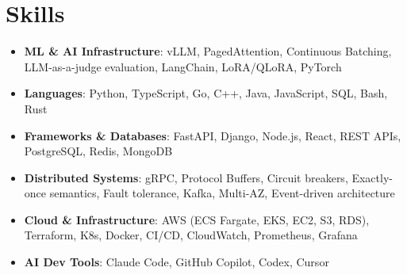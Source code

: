 \documentclass[letterpaper,11pt]{article}
\newcommand{\resumeSubHeadingListStart}{\begin{itemize}[leftmargin=0.15in, label={}]}
\newcommand{\resumeSubHeadingListEnd}{\end{itemize}}
\newcommand{\resumeSkillHeading}[2]{%
  \item\small{\textbf{#1}: #2 \vspace{-9pt}}%
}
\begin{document}
\section{Skills}
  \resumeSubHeadingListStart
    \resumeSkillHeading{ML \& AI Infrastructure}{vLLM, PagedAttention, Continuous Batching, LLM-as-a-judge evaluation, LangChain, LoRA/QLoRA, PyTorch}
    \resumeSkillHeading{Languages}{Python, TypeScript, Go, C++, Java, JavaScript, SQL, Bash, Rust}
    \resumeSkillHeading{Frameworks \& Databases}{FastAPI, Django, Node.js, React, REST APIs, PostgreSQL, Redis, MongoDB}
    \resumeSkillHeading{Distributed Systems}{gRPC, Protocol Buffers, Circuit breakers, Exactly-once semantics, Fault tolerance, Kafka, Multi-AZ, Event-driven architecture}
    \resumeSkillHeading{Cloud \& Infrastructure}{AWS (ECS Fargate, EKS, EC2, S3, RDS), Terraform, K8s, Docker, CI/CD, CloudWatch, Prometheus, Grafana}
    \resumeSkillHeading{AI Dev Tools}{Claude Code, GitHub Copilot, Codex, Cursor}
  \resumeSubHeadingListEnd
\end{document}
